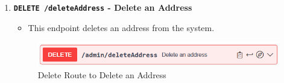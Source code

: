 \begin{enumerate}
        \item \textbf{\texttt{DELETE /deleteAddress} - Delete an Address}
        \begin{itemize}
            \item This endpoint deletes an address from the system.
        \end{itemize} 
        \begin{figure} [H]
            \centering
            \includegraphics [width=1\textwidth] {images/andreas/praxis/deleteAddress.png}
            \caption{Delete Route to Delete an Address}
        \end{figure}
    \end{enumerate}
    \pagebreak